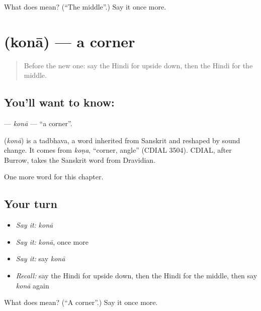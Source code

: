 \begin{tcolorbox}[breakable,colback=teal!4,colframe=teal!35!black,title={Before you move on}]
What does  mean? (\textquotedblleft{}The middle\textquotedblright{}.) Say it once more.
\end{tcolorbox}
\section[\texorpdfstring{\hi{कोना} (konā)}{कोना (konā)}]{ (konā) — a corner}

\label{lesson:HI-C234-kona}



\begin{quote}
Before the new one: say the Hindi for upside down, then the Hindi for the middle.
\end{quote}

\subsection*{You'll want to know: }
\textbf{} — \emph{konā} — \textquotedblleft{}a corner\textquotedblright{}.

\begin{cousinweb}
\textbf{} (\emph{konā}) is a tadbhava, a word inherited from Sanskrit and reshaped by sound change. It comes from \emph{koṇa}, \textquotedblleft{}corner, angle\textquotedblright{} (CDIAL 3504). CDIAL, after Burrow, takes the Sanskrit word from Dravidian.
\end{cousinweb}

\begin{grammarlens}[title={What you've built}]
One more word for this chapter.
\end{grammarlens}

\subsection*{Your turn}
\begin{itemize}
\raggedright
  \item \emph{Say it:} \emph{konā}
  \item \emph{Say it:} \emph{konā}, once more
  \item \emph{Say it:} say \emph{konā}
  \item \emph{Recall:} say the Hindi for upside down, then the Hindi for the middle, then say \emph{konā} again
\end{itemize}

\begin{tcolorbox}[breakable,colback=teal!4,colframe=teal!35!black,title={Before you move on}]
What does  mean? (\textquotedblleft{}A corner\textquotedblright{}.) Say it once more.
\end{tcolorbox}
